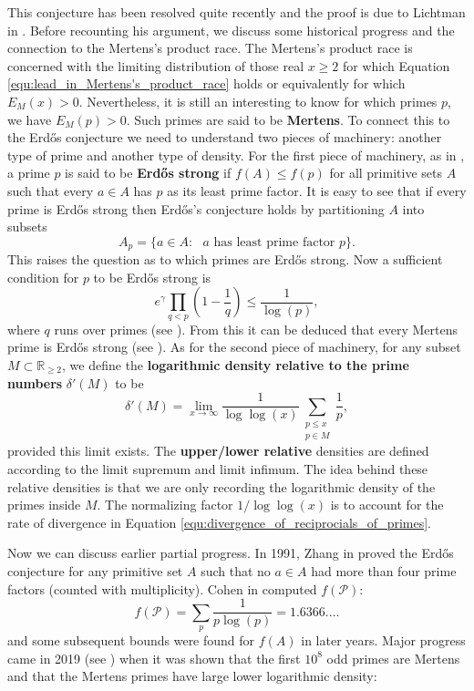 \documentclass[12pt,reqno]{amsart}
\theoremstyle{definition}
\numberwithin{equation}{section}
\newcommand{\R}{{\mathbb R}}
\begin{document}
This conjecture has been resolved quite recently and the proof is due to Lichtman in \cite{Li}. Before recounting his argument, we discuss some historical progress and the connection to the Mertens's product race. The Mertens's product race is concerned with the limiting distribution of those real $x \ge 2$ for which Equation \ref{equ:lead_in_Mertens's_product_race} holds or equivalently for which $E_{M}(x) > 0$. Nevertheless, it is still an interesting to know for which primes $p$, we have $E_{M}(p) > 0$. Such primes are said to be \textbf{Mertens}. To connect this to the Erd\H{o}s conjecture we need to understand two pieces of machinery: another type of prime and another type of density. For the first piece of machinery, as in \cite{LMP}, a prime $p$ is said to be \textbf{Erd\H{o}s strong} if $f(A) \le f(p)$ for all primitive sets $A$ such that every $a \in A$ has $p$ as its least prime factor. It is easy to see that if every prime is Erd\H{o}s strong then Erd\H{o}s's conjecture holds by partitioning $A$ into subsets
\[
        A_{p} = \{a \in A:\text{ $a$ has least prime factor $p$}\}.
\]
This raises the question as to which primes are Erd\H{o}s strong. Now a sufficient condition for $p$ to be Erd\H{o}s strong is
\[
    e^{\gamma}\prod_{q < p}\left(1-\frac{1}{q}\right) \le \frac{1}{\log(p)},
\]
where $q$ runs over primes (see \cite{Li}). From this it can be deduced that every Mertens prime is Erd\H{o}s strong (see \cite{LP}). As for the second piece of machinery, for any subset $M \subset \R_{\ge 2}$, we define the \textbf{logarithmic density relative to the prime numbers} $\delta'(M)$ to be
\[
    \delta'(M) = \lim_{x \to \infty}\frac{1}{\log\log(x)}\sum_{\substack{p \le x \\ p \in M}}\frac{1}{p},
\]
provided this limit exists. The \textbf{upper/lower relative} densities are defined according to the limit supremum and limit infimum. The idea behind these relative densities is that we are only recording the logarithmic density of the primes inside $M$. The normalizing factor $1/\log\log(x)$ is to account for the rate of divergence in Equation \ref{equ:divergence_of_reciprocials_of_primes}. 

Now we can discuss earlier partial progress. In 1991, Zhang in \cite{Z} proved the Erd\H{o}s conjecture for any primitive set $A$ such that no $a \in A$ had more than four prime factors (counted with multiplicity). Cohen in \cite{C} computed $f(\mathcal{P})$:
\[
    f(\mathcal{P}) = \sum_{p}\frac{1}{p\log(p)} = 1.6366....
\]
and some subsequent bounds were found for $f(A)$ in later years. Major progress came in 2019 (see \cite{LP}) when it was shown that the first $10^{8}$ odd primes are Mertens and that the Mertens primes have large lower logarithmic density:
\end{document}
